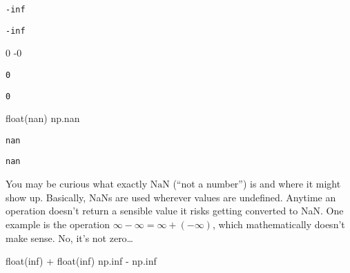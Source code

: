 \documentclass[
  letterpaper,
  DIV=11,
  numbers=noendperiod]{scrreprt}
\newenvironment{Shaded}{\begin{snugshade}}{\end{snugshade}}
\newcommand{\BuiltInTok}[1]{\textcolor[rgb]{0.00,0.23,0.31}{#1}}
\newcommand{\DecValTok}[1]{\textcolor[rgb]{0.68,0.00,0.00}{#1}}
\newcommand{\NormalTok}[1]{\textcolor[rgb]{0.00,0.23,0.31}{#1}}
\newcommand{\OperatorTok}[1]{\textcolor[rgb]{0.37,0.37,0.37}{#1}}
\newcommand{\StringTok}[1]{\textcolor[rgb]{0.13,0.47,0.30}{#1}}
\begin{document}
\begin{verbatim}
-inf
\end{verbatim}

\begin{verbatim}
-inf
\end{verbatim}

\begin{Shaded}
\begin{Highlighting}[]
\DecValTok{0}
\OperatorTok{{-}}\DecValTok{0}
\end{Highlighting}
\end{Shaded}

\begin{verbatim}
0
\end{verbatim}

\begin{verbatim}
0
\end{verbatim}

\begin{Shaded}
\begin{Highlighting}[]
\BuiltInTok{float}\NormalTok{(}\StringTok{\textquotesingle{}nan\textquotesingle{}}\NormalTok{)}
\NormalTok{np.nan}
\end{Highlighting}
\end{Shaded}

\begin{verbatim}
nan
\end{verbatim}

\begin{verbatim}
nan
\end{verbatim}

You may be curious what exactly \(\text{NaN}\) (``not a number'') is and
where it might show up. Basically, NaNs are used wherever values are
undefined. Anytime an operation doesn't return a sensible value it risks
getting converted to NaN. One example is the operation
\(\infty - \infty = \infty + (-\infty)\), which mathematically doesn't
make sense. No, it's not zero\ldots{}

\begin{Shaded}
\begin{Highlighting}[]
\BuiltInTok{float}\NormalTok{(}\StringTok{\textquotesingle{}inf\textquotesingle{}}\NormalTok{) }\OperatorTok{+} \BuiltInTok{float}\NormalTok{(}\StringTok{\textquotesingle{}{-}inf\textquotesingle{}}\NormalTok{)}
\NormalTok{np.inf }\OperatorTok{{-}}\NormalTok{ np.inf}
\end{Highlighting}
\end{Shaded}
\end{document}
